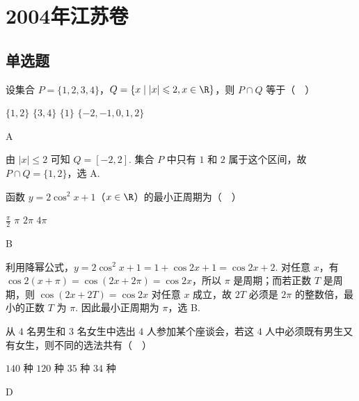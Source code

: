 \chapter{2004年江苏卷}
\section{单选题}
\begin{problem}
设集合 \(P = \{1, 2, 3, 4\}\)，\(Q = \{x \mid |x| \leqslant 2, x \in \R\}\)，则 \(P \cap Q\) 等于（\(\quad\)）

\choices
    {\(\{1, 2\}\)}
    {\(\{3,4\}\)}
    {\( \{1\} \)}
    {\(\{-2, -1, 0, 1, 2\}\)}
\end{problem}

\begin{answer}
A
\end{answer}

\begin{solution}
由 \(|x|\leqslant2\) 可知 \(Q=[-2,2]\). 集合 \(P\) 中只有 \(1\) 和 \(2\) 属于这个区间，故 \(P\cap Q=\{1,2\}\)，选 A.
\end{solution}

\begin{problem}
函数 \(y = 2\cos^2 x + 1\)（\(x \in \R\)）的最小正周期为（\(\quad\)）

\choices
    {\( \frac{\pi}{2} \)}
    {\(\pi\)}
    {\(2\pi\)}
    {\(4\pi\)}
\end{problem}

\begin{answer}
B
\end{answer}

\begin{solution}
利用降幂公式，\(y=2\cos^2x+1=1+\cos2x+1=\cos2x+2\). 对任意 \(x\)，有 \(\cos 2(x+\pi)=\cos(2x+2\pi)=\cos2x\)，所以 \(\pi\) 是周期；而若正数 \(T\) 是周期，则 \(\cos(2x+2T)=\cos2x\) 对任意 \(x\) 成立，故 \(2T\) 必须是 \(2\pi\) 的整数倍，最小的正数 \(T\) 为 \(\pi\). 因此最小正周期为 \(\pi\)，选 B.
\end{solution}

\begin{problem}
从 \(4\) 名男生和 \(3\) 名女生中选出 \(4\) 人参加某个座谈会，若这 \(4\) 人中必须既有男生又有女生，则不同的选法共有（\(\quad\)）

\choices
    {\(140\) 种}
    {\(120\) 种}
    {\(35\) 种}
    {\(34\) 种}
\end{problem}

\begin{answer}
D
\end{answer}

